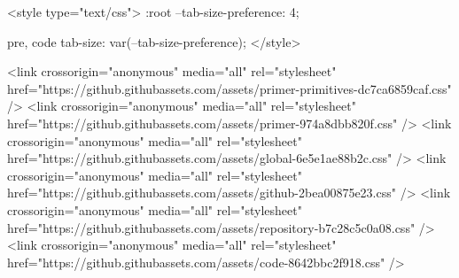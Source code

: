   <style type="text/css">
    :root {
      --tab-size-preference: 4;
    }

    pre, code {
      tab-size: var(--tab-size-preference);
    }
  </style>

    <link crossorigin="anonymous" media="all" rel="stylesheet" href="https://github.githubassets.com/assets/primer-primitives-dc7ca6859caf.css" />
    <link crossorigin="anonymous" media="all" rel="stylesheet" href="https://github.githubassets.com/assets/primer-974a8dbb820f.css" />
    <link crossorigin="anonymous" media="all" rel="stylesheet" href="https://github.githubassets.com/assets/global-6e5e1ae88b2c.css" />
    <link crossorigin="anonymous" media="all" rel="stylesheet" href="https://github.githubassets.com/assets/github-2bea00875e23.css" />
  <link crossorigin="anonymous" media="all" rel="stylesheet" href="https://github.githubassets.com/assets/repository-b7c28c5c0a08.css" />
<link crossorigin="anonymous" media="all" rel="stylesheet" href="https://github.githubassets.com/assets/code-8642bbc2f918.css" />

  


